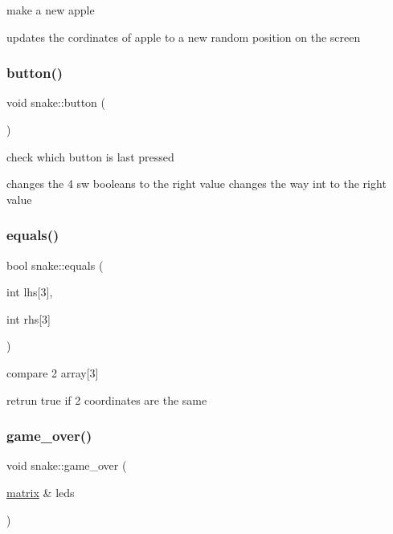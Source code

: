 make a new apple 

updates the cordinates of apple to a new random position on the screen \mbox{\label{classsnake_a5097f60b9b688f68f512d721b1e5700a}} 
\subsubsection{\texorpdfstring{button()}{button()}}
{\footnotesize\ttfamily void snake\+::button (\begin{DoxyParamCaption}{ }\end{DoxyParamCaption})}



check which button is last pressed 

changes the 4 sw booleans to the right value changes the way int to the right value \mbox{\label{classsnake_a0933aa0958514b5181b782e73a2ac14f}} 
\subsubsection{\texorpdfstring{equals()}{equals()}}
{\footnotesize\ttfamily bool snake\+::equals (\begin{DoxyParamCaption}\item[{int}]{lhs\mbox{[}3\mbox{]},  }\item[{int}]{rhs\mbox{[}3\mbox{]} }\end{DoxyParamCaption})}



compare 2 array\mbox{[}3\mbox{]} 

retrun true if 2 coordinates are the same \mbox{\label{classsnake_ab0a41a85507415018d8f6d6c9e6fb42c}} 
\subsubsection{\texorpdfstring{game\+\_\+over()}{game\_over()}}
{\footnotesize\ttfamily void snake\+::game\+\_\+over (\begin{DoxyParamCaption}\item[{\hyperlink{classmatrix}{matrix} \&}]{leds }\end{DoxyParamCaption})}



